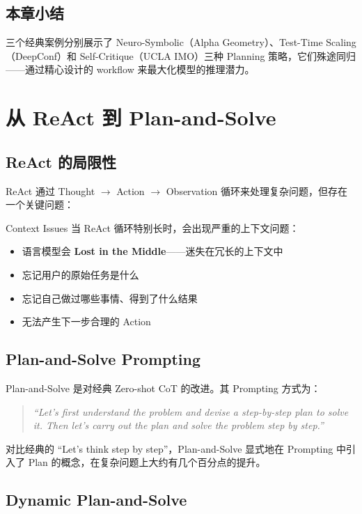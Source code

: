 \documentclass[a4paper]{article}
\begin{document}
\subsection{本章小结}

三个经典案例分别展示了 Neuro-Symbolic（Alpha Geometry）、Test-Time Scaling（DeepConf）和 Self-Critique（UCLA IMO）三种 Planning 策略，它们殊途同归——通过精心设计的 workflow 来最大化模型的推理潜力。


\section{从 ReAct 到 Plan-and-Solve}

\subsection{ReAct 的局限性}

ReAct 通过 Thought $\rightarrow$ Action $\rightarrow$ Observation 循环来处理复杂问题，但存在一个关键问题：

\begin{warningbox}{Context Issues}
当 ReAct 循环特别长时，会出现严重的上下文问题：
\begin{itemize}
    \item 语言模型会 \textbf{Lost in the Middle}——迷失在冗长的上下文中
    \item 忘记用户的原始任务是什么
    \item 忘记自己做过哪些事情、得到了什么结果
    \item 无法产生下一步合理的 Action
\end{itemize}
\end{warningbox}

\subsection{Plan-and-Solve Prompting}

Plan-and-Solve 是对经典 Zero-shot CoT 的改进。其 Prompting 方式为：

\begin{quote}
\textit{``Let's first understand the problem and devise a step-by-step plan to solve it. Then let's carry out the plan and solve the problem step by step.''}
\end{quote}

对比经典的 ``Let's think step by step''，Plan-and-Solve 显式地在 Prompting 中引入了 Plan 的概念，在复杂问题上大约有几个百分点的提升。

\subsection{Dynamic Plan-and-Solve}
\end{document}
